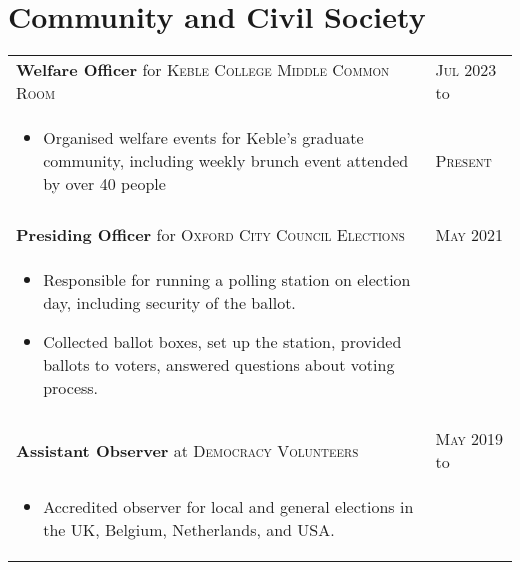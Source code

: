 \documentclass[a4paper,10pt]{article}
\newcommand{\datelen}{1.8cm}
\newcommand{\descrlen}{15.5cm}
\begin{document}
\begin{comment}
  \textsc{Oct 2010} to&Founding member of \textbf{Birmingham Autonomous Robotics Club}\\
  \textsc{Jul 2013}&\footnotesize{Co-founded the club due to interest from computer science faculty and undergraduate students in solving robotics problems and increasing the profile of the field in the school.}\\
\end{tabular}
\end{comment}
\newpage
\section{Community and  Civil Society}
\begin{tabular}{p{\descrlen}|p{\datelen}}
  \textbf{Welfare Officer} for \textsc{Keble College Middle Common Room} & \textsc{Jul 2023} to\\
  \small{
  \vspace{-0.4cm}
  \begin{itemize}
  \item Organised welfare events for Keble's graduate community, including weekly brunch event attended by over 40 people
    \vspace{-0.5cm}
  \end{itemize}}&\textsc{Present}\\\multicolumn{2}{c}{} \\[-0.2cm]
  \textbf{Presiding Officer} for \textsc{Oxford City Council Elections}&\textsc{May 2021}\\
  \small{
  \vspace{-0.4cm}
  \begin{itemize}
  \item Responsible for running a polling station on election day, including security of the ballot.
  \item Collected ballot boxes, set up the station, provided ballots to voters, answered questions about voting process.
    \vspace{-0.5cm}
  \end{itemize}}&\\\multicolumn{2}{c}{} \\[-0.2cm]
  \textbf{Assistant Observer} at \textsc{Democracy Volunteers} & \textsc{May 2019} to\\
  \small{
  \vspace{-0.4cm}
  \begin{itemize}
  \item Accredited observer for local and general elections in the UK, Belgium, Netherlands, and USA. 

\end{itemize}}
\end{tabular}
\end{document}
